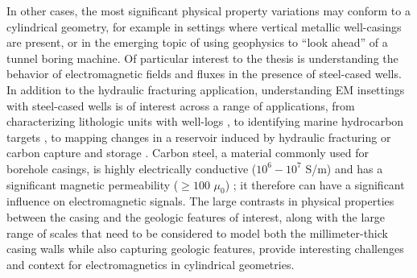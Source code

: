 In other cases, the most significant physical property variations may conform to a cylindrical geometry, for example in settings where vertical metallic well-casings are present, or in the emerging topic of using geophysics to ``look ahead'' of a tunnel boring machine. Of particular interest to the thesis is understanding the behavior of electromagnetic fields and fluxes in the presence of steel-cased wells. In addition to the hydraulic fracturing application, understanding EM insettings with steel-cased wells is of interest across a range of applications, from characterizing lithologic units with well-logs \citep{Kaufman1990, Kaufman1993, Augustin1989}, to identifying marine hydrocarbon targets \citep{Kong2009, Swidinsky2013, Tietze2015}, to mapping changes in a reservoir induced by hydraulic fracturing or carbon capture and storage \citep{Pardo2013, Borner2015, Um2015, Weiss2016, hoversten2017borehole, Zhang2018}. Carbon steel, a material commonly used for borehole casings, is highly electrically conductive ($10^6 - 10^7$ S/m) and has a significant magnetic permeability ($\geq 100$ $\mu_0$) \citep{wuhabashy1994}; it therefore can have a significant influence on electromagnetic signals. The large contrasts in physical properties between the casing and the geologic features of interest, along with the large range of scales that need to be considered to model both the millimeter-thick casing walls while also capturing geologic features, provide interesting challenges and context for electromagnetics in cylindrical geometries.

